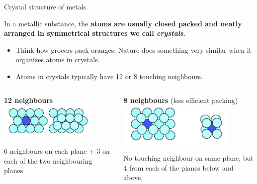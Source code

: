 \begin{frame}{Crystal structure of metals}

In a metallic substance, the {\bf atoms are usually closed packed and neatly arranged
in symmetrical structures we call {\em crystals}}.\\
\vspace{0.2cm}
\begin{itemize}
  \item Think how grocers pack oranges: Nature does something very similar when it organizes
        atoms in crystals.
  \item Atoms in crystals typically have 12 or 8 touching neighbours.
\end{itemize}

\begin{columns}
  \begin{column}{0.50\textwidth}
      \begin{center}
         {\bf 12 neighbours} \\
         \vspace{0.23cm}
         \includegraphics[width=0.80\textwidth]{./images/schematics/crystals_12_touching_neighbours.png}
      \end{center}
      {\scriptsize
        6 neighbours on each plane + 3 on each of the two neighbouring planes.\\
      }
  \end{column}
  \begin{column}{0.50\textwidth}
      \begin{center}
         {\bf 8 neighbours} (less efficient packing) \\
         \includegraphics[width=0.80\textwidth]{./images/schematics/crystals_8_touching_neighbours.png}
      \end{center}
      {\scriptsize
        No touching neighbour on same plane, but 4 from each of the planes below and above.\\
      }
  \end{column}
\end{columns}

\end{frame}

